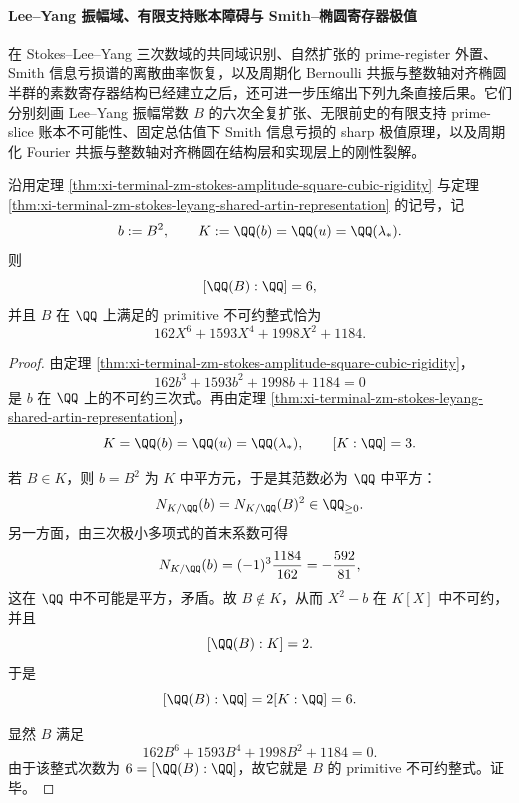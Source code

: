 \paragraph{Lee--Yang 振幅域、有限支持账本障碍与 Smith--椭圆寄存器极值}
在 Stokes--Lee--Yang 三次数域的共同域识别、自然扩张的 prime-register 外置、Smith 信息亏损谱的离散曲率恢复，以及周期化 Bernoulli 共振与整数轴对齐椭圆半群的素数寄存器结构已经建立之后，还可进一步压缩出下列九条直接后果。它们分别刻画 Lee--Yang 振幅常数 \(B\) 的六次全复扩张、无限前史的有限支持 prime-slice 账本不可能性、固定总估值下 Smith 信息亏损的 sharp 极值原理，以及周期化 Fourier 共振与整数轴对齐椭圆在结构层和实现层上的刚性裂解。

\begin{theorem}\label{thm:xi-time-part74-leyang-amplitude-sixth-irreducibility}
沿用定理 \ref{thm:xi-terminal-zm-stokes-amplitude-square-cubic-rigidity} 与定理 \ref{thm:xi-terminal-zm-stokes-leyang-shared-artin-representation} 的记号，记
\[
b:=B^2,
\qquad
K:=\QQ(b)=\QQ(u)=\QQ(\lambda_*).
\]
则
\[
[\QQ(B):\QQ]=6,
\]
并且 \(B\) 在 \(\QQ\) 上满足的 primitive 不可约整式恰为
\[
\boxed{\;
162X^6+1593X^4+1998X^2+1184.\;}
\]
\end{theorem}
\begin{proof}
由定理 \ref{thm:xi-terminal-zm-stokes-amplitude-square-cubic-rigidity}，
\[
162b^3+1593b^2+1998b+1184=0
\]
是 \(b\) 在 \(\QQ\) 上的不可约三次式。再由定理
\ref{thm:xi-terminal-zm-stokes-leyang-shared-artin-representation}，
\[
K=\QQ(b)=\QQ(u)=\QQ(\lambda_*),
\qquad
[K:\QQ]=3.
\]

若 \(B\in K\)，则 \(b=B^2\) 为 \(K\) 中平方元，于是其范数必为 \(\QQ\) 中平方：
\[
N_{K/\QQ}(b)=N_{K/\QQ}(B)^2\in \QQ_{\ge 0}.
\]
另一方面，由三次极小多项式的首末系数可得
\[
N_{K/\QQ}(b)=(-1)^3\frac{1184}{162}=-\frac{592}{81},
\]
这在 \(\QQ\) 中不可能是平方，矛盾。故 \(B\notin K\)，从而 \(X^2-b\) 在 \(K[X]\) 中不可约，并且
\[
[\QQ(B):K]=2.
\]
于是
\[
[\QQ(B):\QQ]=2[K:\QQ]=6.
\]

显然 \(B\) 满足
\[
162B^6+1593B^4+1998B^2+1184=0.
\]
由于该整式次数为 \(6=[\QQ(B):\QQ]\)，故它就是 \(B\) 的 primitive 不可约整式。证毕。
\end{proof}

